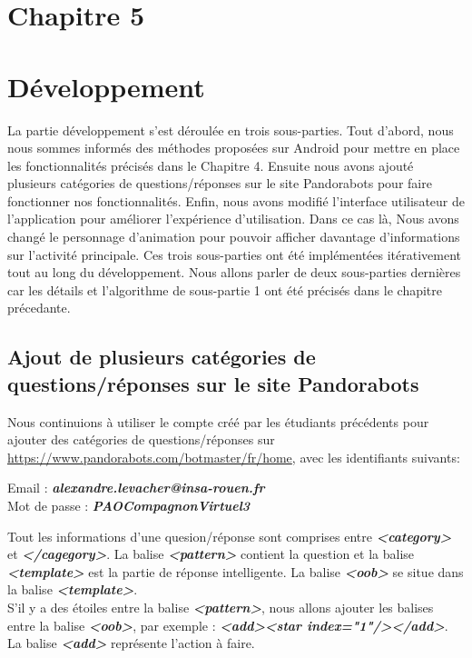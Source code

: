 \section*{Chapitre 5}
\section{Développement}
	La partie développement s'est déroulée en trois sous-parties. Tout d'abord, nous nous sommes informés des méthodes proposées sur Android pour mettre en place les fonctionnalités précisés dans le Chapitre 4. Ensuite nous avons ajouté plusieurs catégories de questions/réponses sur le site Pandorabots pour faire fonctionner nos fonctionnalités. Enfin, nous avons modifié l'interface utilisateur de l'application pour améliorer l'expérience d'utilisation. Dans ce cas là, Nous avons changé le personnage d'animation pour pouvoir afficher davantage d'informations sur l'activité principale. Ces trois sous-parties ont été implémentées itérativement tout au long du développement. Nous allons parler de deux sous-parties dernières car les détails et l'algorithme de sous-partie 1 ont été précisés dans le chapitre précedante.

\subsection{Ajout de plusieurs catégories de questions/réponses sur le site Pandorabots}

\indent Nous continuions à utiliser le compte créé par les étudiants précédents pour ajouter des catégories de questions/réponses sur \url{https://www.pandorabots.com/botmaster/fr/home}, avec les identifiants suivants:

\begin{center}
	Email : \textbf{\emph{alexandre.levacher@insa-rouen.fr}}\\
	Mot de passe : \textbf{\emph{PAOCompagnonVirtuel3}}
\end{center}

\indent Tout les informations d'une quesion/réponse sont comprises entre \textbf{\emph{<category>}} et \textbf{\emph{</cagegory>}}. La balise \textbf{\emph{<pattern>}} contient la question et la balise \textbf{\emph{<template>}} est la partie de réponse intelligente. La balise \textbf{\emph{<oob>}} se situe dans la balise \textbf{\emph{<template>}}.\\
\indent S'il y a des étoiles entre la balise \textbf{\emph{<pattern>}}, nous allons ajouter les balises entre la balise \textbf{\emph{<oob>}}, par exemple : \textbf{\emph{<add><star index="1"/></add>}}. La balise \textbf{\emph{<add>}} représente l'action à faire.

